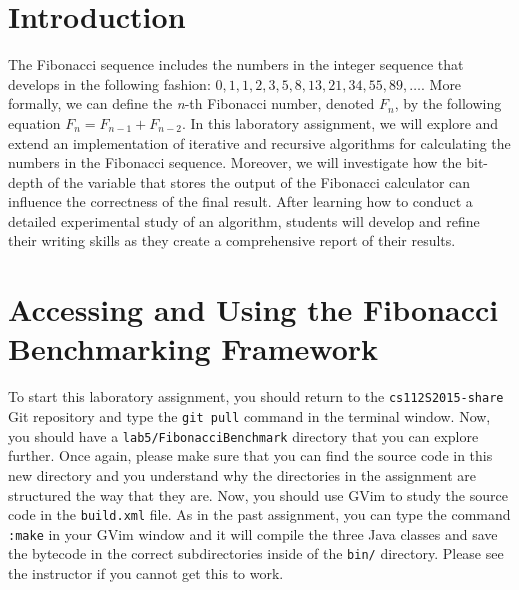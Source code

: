 


\usepackage[compact]{titlesec}


\section*{Introduction}

The Fibonacci sequence includes the numbers in the integer sequence that develops in the following fashion: $0, 1, 1,
2, 3, 5, 8, 13, 21, 34, 55, 89, \ldots$. More formally, we can define the {\em n}-th Fibonacci number, denoted $F_n$,
by the following equation $F_n = F_{n-1} + F_{n-2}$. In this laboratory assignment, we will explore and
extend an implementation of iterative and recursive algorithms for calculating the numbers in the Fibonacci sequence.
Moreover, we will investigate how the bit-depth of the variable that stores the output of the Fibonacci calculator can
influence the correctness of the final result. After learning how to conduct a detailed experimental study of an
algorithm, students will develop and refine their writing skills as they create a comprehensive report of their results.

\section*{Accessing and Using the Fibonacci Benchmarking Framework}

\begin{sloppypar} To start this laboratory assignment, you should return to the {\tt cs112S2015-share} Git repository
  and type the {\tt git pull} command in the terminal window.  Now, you should have a {\tt lab5/FibonacciBenchmark}
  directory that you can explore further.  Once again, please make sure that you can find the source code in this new
  directory and you understand why the directories in the assignment are structured the way that they are. Now, you
  should use GVim to study the source code in the {\tt build.xml} file.  As in the past assignment, you can type the
  command {\tt :make} in your GVim window and it will compile the three Java classes and save the bytecode in the
  correct subdirectories inside of the {\tt bin/} directory.  Please see the instructor if you cannot get this to work.
\end{sloppypar}

